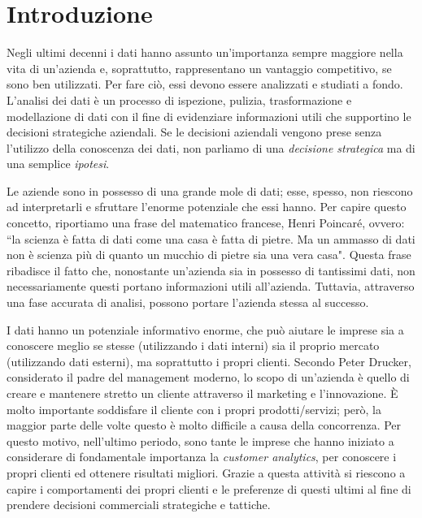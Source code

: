 {}
\chapter*{Introduzione}

Negli ultimi decenni i dati hanno assunto un'importanza sempre maggiore nella vita di un'azienda e, soprattutto, rappresentano un vantaggio competitivo, se sono ben utilizzati. Per fare ciò, essi devono essere analizzati e studiati a fondo. L’analisi dei dati è un processo di ispezione, pulizia, trasformazione e modellazione
di dati con il fine di evidenziare informazioni utili che supportino le decisioni strategiche aziendali.
Se le decisioni aziendali vengono prese senza l'utilizzo della conoscenza dei dati, non parliamo di una \textit{decisione strategica} ma di una semplice \textit{ipotesi}.

Le aziende sono in possesso di una grande mole di dati; esse, spesso, non riescono ad interpretarli e sfruttare l'enorme potenziale che essi hanno. Per capire questo concetto, riportiamo una frase del matematico francese, Henri Poincaré, ovvero: ``la scienza è fatta di dati come una casa è fatta di pietre. Ma un ammasso di dati non è scienza più di quanto un mucchio di pietre sia una vera casa". Questa frase ribadisce il fatto che, nonostante un'azienda sia in possesso di tantissimi dati, non necessariamente questi portano informazioni utili all'azienda. Tuttavia, attraverso una fase accurata di analisi, possono portare l'azienda stessa al successo. 

I dati hanno un potenziale informativo enorme, che può aiutare le imprese sia a conoscere meglio se stesse (utilizzando i dati interni) sia il proprio mercato (utilizzando dati esterni), ma soprattutto i propri clienti.  Secondo Peter Drucker, considerato il padre del management moderno, lo scopo di un’azienda è quello di creare e mantenere stretto un cliente attraverso il marketing e l’innovazione. \uppercase{è} molto importante soddisfare il cliente con i propri prodotti/servizi;  però, la maggior parte delle volte questo è molto difficile a causa della concorrenza.  Per questo motivo, nell'ultimo  periodo, sono tante le imprese che  hanno  iniziato a  considerare  di  fondamentale  importanza  la  \textit{customer  analytics},  per  conoscere  i propri clienti ed ottenere risultati migliori. Grazie a questa attività si riescono a capire i comportamenti dei propri clienti e le preferenze di questi ultimi al fine di prendere decisioni commerciali strategiche  e  tattiche. 


